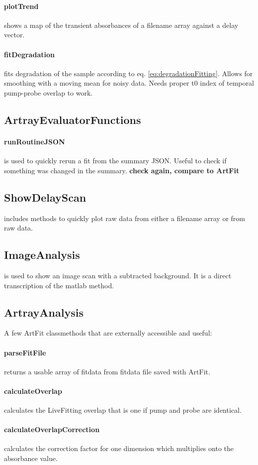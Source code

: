\documentclass[twoside,openright]{scrreprt}
\begin{document}
{\paragraph{plotTrend} shows a map of the transient absorbances of a filename array against a delay vector. 
\paragraph{fitDegradation} fits degradation of the sample according to eq. \ref{eq:degradationFitting}. Allows for smoothing with a moving mean for noisy data. Needs proper t0 index of temporal pump-probe overlap to work.
\subsection*{ArtrayEvaluatorFunctions}
\paragraph{runRoutineJSON} is used to quickly rerun a fit from the summary JSON. Useful to check if something was changed in the summary. \textbf{check again, compare to ArtFit}
\subsection*{ShowDelayScan} includes methods to quickly plot raw data from either a filename array or from raw data.
\subsection*{ImageAnalysis} is used to show an image scan with a subtracted background. It is a direct transcription of the matlab method.
\subsection*{ArtrayAnalysis}
A few ArtFit classmethods that are externally accessible and useful:
\paragraph{parseFitFile} returns a usable array of fitdata from fitdata file saved with ArtFit.
\paragraph{calculateOverlap} calculates the LiveFitting overlap that is one if pump and probe are identical.
\paragraph{calculateOverlapCorrection} calculates the correction factor for one dimension which multiplies onto the absorbance value.
}
\end{document}
